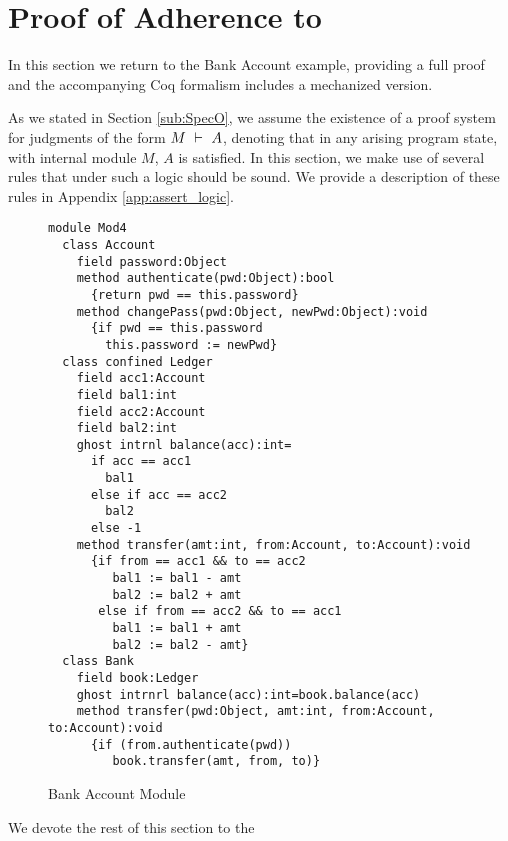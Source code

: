 \section{Proof of Adherence to {{}}}
\label{s:examples}

In this section we return to the Bank Account example, 
providing a full proof and
the accompanying Coq formalism includes a mechanized version.


As we stated in Section \ref{sub:SpecO}, 
we assume the existence of a proof system for judgments
of the form $M\ \vdash\ A$, denoting that in 
any arising program state, with internal module $M$, $A$ is satisfied. 
In this section, we make use of several rules that under such a logic should be sound.
We provide a description of these rules in Appendix \ref{app:assert_logic}. 

\begin{figure}[t]
\begin{lstlisting}[mathescape=true, frame=lines]
module Mod4
  class Account
    field password:Object
    method authenticate(pwd:Object):bool
      {return pwd == this.password}
    method changePass(pwd:Object, newPwd:Object):void
      {if pwd == this.password
        this.password := newPwd}
  class confined Ledger
    field acc1:Account
    field bal1:int
    field acc2:Account
    field bal2:int
    ghost intrnl balance(acc):int=
      if acc == acc1
        bal1
      else if acc == acc2
        bal2
      else -1
    method transfer(amt:int, from:Account, to:Account):void
      {if from == acc1 && to == acc2
         bal1 := bal1 - amt
         bal2 := bal2 + amt
       else if from == acc2 && to == acc1
         bal1 := bal1 + amt
         bal2 := bal2 - amt}
  class Bank
    field book:Ledger
    ghost intrnrl balance(acc):int=book.balance(acc)
    method transfer(pwd:Object, amt:int, from:Account, to:Account):void
      {if (from.authenticate(pwd))
         book.transfer(amt, from, to)}
\end{lstlisting}
\caption{Bank Account Module}
\label{f:ex-bank-short}
\end{figure}
We devote the rest of this section to the   

